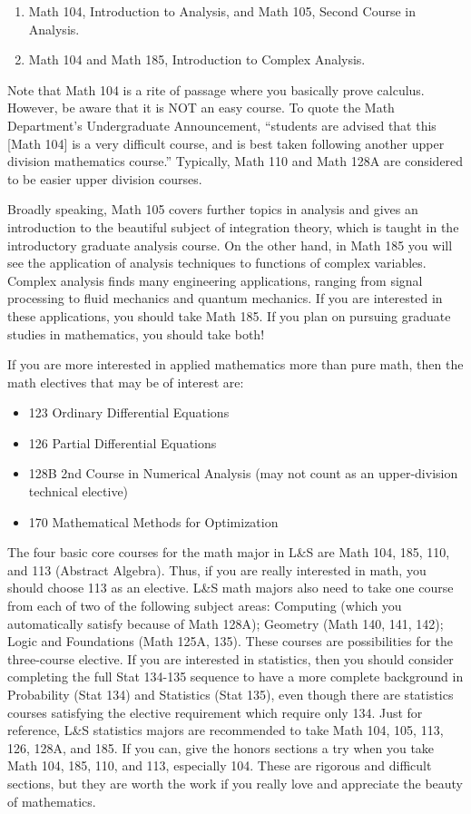 \begin{enumerate}
  \item Math 104, Introduction to Analysis, and Math 105, Second Course in Analysis.
  \item Math 104 and Math 185, Introduction to Complex Analysis.
\end{enumerate}

Note that Math 104 is a rite of passage where you basically prove calculus.
However, be aware that it is NOT an easy course.
To quote the Math Department’s Undergraduate Announcement, “students are advised that this [Math 104] is a very difficult course, and is best taken following another upper division mathematics course.”
Typically, Math 110 and Math 128A are considered to be easier upper division courses.

Broadly speaking, Math 105 covers further topics in analysis and gives an introduction to the beautiful subject of integration theory, which is taught in the introductory graduate analysis course.
On the other hand, in Math 185 you will see the application of analysis techniques to functions of complex variables.
Complex analysis finds many engineering applications, ranging from signal processing to fluid mechanics and quantum mechanics.
If you are interested in these applications, you should take Math 185.
If you plan on pursuing graduate studies in mathematics, you should take both!

If you are more interested in applied mathematics more than pure math, then the math electives that may be of interest are:

\begin{itemize}
  \item 123 Ordinary Differential Equations
  \item 126 Partial Differential Equations
  \item 128B 2nd Course in Numerical Analysis (may not count as an upper-division technical elective)
  \item 170 Mathematical Methods for Optimization
\end{itemize}

The four basic core courses for the math major in L\&S are Math 104, 185, 110, and 113 (Abstract Algebra).
Thus, if you are really interested in math, you should choose 113 as an elective. L\&S math majors also need to take one course from each of two of the following subject areas: Computing (which you automatically satisfy because of Math 128A); Geometry (Math 140, 141, 142); Logic and Foundations (Math 125A, 135). These courses are possibilities for the three-course elective. If you are interested in statistics, then you should consider completing the full Stat 134-135 sequence to have a more complete background in Probability (Stat 134) and Statistics (Stat 135), even though there are statistics courses satisfying the elective requirement which require only 134. Just for reference, L\&S statistics majors are recommended to take Math 104, 105, 113, 126, 128A, and 185. If you can, give the honors sections a try when you take Math 104, 185, 110, and 113, especially 104. These are rigorous and difficult sections, but they are worth the work if you really love and appreciate the beauty of mathematics.

